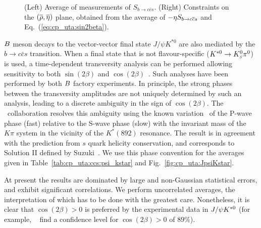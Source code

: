 \begin{figure}[htb]
\begin{center}
{    }
  \end{center}
  \vspace{-0.5cm}
  \caption{
    (Left) Average of measurements of $S_{b \to c\bar c s}$.
    (Right) Constraints on the $(\overline{\rho},\overline{\eta})$ plane,
    obtained from the average of $-\etacp S_{b \to c\bar c s}$ 
    and Eq.~(\ref{eq:cp_uta:sin2beta}).
  }
  \label{fig:cp_uta:ccs}
\end{figure}

\label{sec:cp_uta:ccs:vv}

$B$ meson decays to the vector-vector final state $J/\psi K^{*0}$
are also mediated by the $b \to c \bar c s$ transition.
When a final state that is not flavour-specific ($K^{*0} \to K^0_{\scriptscriptstyle S} \pi^0$) is used,
a time-dependent transversity analysis can be performed 
allowing sensitivity to both 
$\sin(2\beta)$ and $\cos(2\beta)$~\cite{Dunietz:1990cj}.
Such analyses have been performed by both $B$ factory experiments.
In principle, the strong phases between the transversity amplitudes
are not uniquely determined by such an analysis, 
leading to a discrete ambiguity in the sign of $\cos(2\beta)$.
The \babar\ collaboration resolves 
this ambiguity using the known variation~\cite{Aston:1987ir}
of the P-wave phase (fast) relative to the S-wave phase (slow) 
with the invariant mass of the $K\pi$ system 
in the vicinity of the $K^*(892)$ resonance. 
The result is in agreement with the prediction from 
$s$ quark helicity conservation,
and corresponds to Solution II defined by Suzuki~\cite{Suzuki:2001za}.
We use this phase convention for the averages given in 
Table~\ref{tab:cp_uta:ccs:psi_kstar} and Fig.~\ref{fig:cp_uta:JpsiKstar}.



At present the results are dominated by 
large and non-Gaussian statistical errors,
and exhibit significant correlations.
We perform uncorrelated averages, 
the interpretation of which has to be done with the greatest care. 
Nonetheless, it is clear that $\cos(2\beta)>0$ is preferred 
by the experimental data in $J/\psi K^{*0}$ 
(for example, \babar~\cite{Aubert:2004cp} 
find a confidence level for $\cos(2\beta)>0$ of $89\%$).

